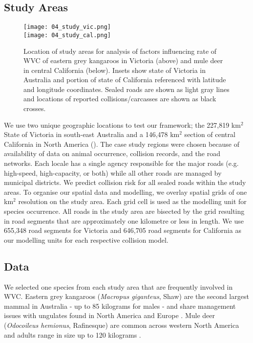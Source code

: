 \subsection{Study Areas}

\begin{figure*}[htp]
  \centering
  \texttt{[image: 04\_study\_vic.png]}\\
  \texttt{[image: 04\_study\_cal.png]}
  \caption[]{Location of study areas for analysis of factors influencing rate of WVC of eastern grey kangaroos in Victoria (above) and mule deer in central California (below). Insets show state of Victoria in Australia and portion of state of California referenced with latitude and longitude coordinates.  Sealed roads are shown as light gray lines and locations of reported collisions/carcasses are shown as black crosses.}
  \label{cal_study_area}
\end{figure*}

We use two unique geographic locations to test our framework; the 227,819 km$^2$ State of Victoria in south-east Australia and a 146,478 km$^2$ section of central California in North America (). The case study regions were chosen because of availability of data on animal occurrence, collision records, and the road networks. Each locale has a single agency responsible for the major roads (e.g. high-speed, high-capacity, or both) while all other roads are managed by municipal districts. We predict collision risk for all sealed roads within the study areas. To organise our spatial data and modelling, we overlay spatial grids of one km$^2$ resolution on the study area. Each grid cell is used as the modelling unit for species occurrence. All roads in the study area are bisected by the grid resulting in road segments that are approximately one kilometre or less in length. We use 655,348 road segments for Victoria and 646,705 road segments for California as our modelling units for each respective collision model.

\subsection{Data}

We selected one species from each study area that are frequently involved in WVC. Eastern grey kangaroos (\textit{Macropus giganteus}, Shaw) are the second largest mammal in Australia - up to 85 kilograms for males \citep{vand08} - and share management issues with ungulates found in North America and Europe \citep{crof04,coul10}.  Mule deer (\textit{Odocoileus hemionus}, Rafinesque) are common across western North America and adults range in size up to 120 kilograms \citep{kays09}.

